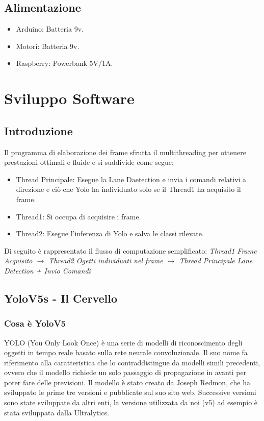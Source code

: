 \documentclass{article}
\begin{document}
\newpage

\subsection{Alimentazione}
\begin{itemize}
\item Arduino: Batteria 9v.
\item Motori: Batteria 9v.
\item Raspberry: Powerbank 5V/1A.
\end{itemize}

\section{Sviluppo Software}
\subsection{Introduzione}
Il programma di elaborazione dei frame sfrutta il \cite{multithreading} multithreading per ottenere prestazioni ottimali e fluide e si suddivide come segue:

\begin{itemize}
    \item Thread Principale: Esegue la Lane Daetection e invia i comandi relativi a direzione e ciò che Yolo ha individuato solo se il Thread1 ha acquisito il frame.
    \item Thread1: Si occupa di acquisire i frame. 
    \item Thread2: Esegue l'inferenza di Yolo e salva le classi rilevate.
\end{itemize} 

Di seguito è rappresentato il flusso di computazione semplificato:
\textit{Thread1 Frame Acquisito  $\rightarrow$ Thread2 Ogetti individuati nel frame $\rightarrow$ Thread Principale Lane Detection + Invio Comandi}  


\subsection{YoloV5s - Il Cervello}
    
    \subsubsection{Cosa è YoloV5}
    \cite{yolov5arch}
    YOLO (You Only Look Once) è una serie di modelli di riconoscimento degli oggetti in tempo reale basato sulla rete neurale convoluzionale. Il suo nome fa riferimento alla caratteristica che lo contraddistingue da modelli simili precedenti, ovvero che il modello richiede un solo passaggio di propagazione in avanti per poter fare delle previsioni.
    Il modello è stato creato da Joseph Redmon, che ha sviluppato le prime tre versioni e pubblicate sul suo sito web. Successive versioni sono state sviluppate da altri enti, la versione utilizzata da noi (v5) ad esempio è stata sviluppata dalla Ultralytics.
    
\end{document}
